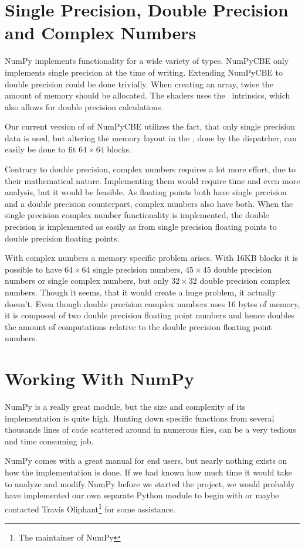 \section{Single Precision, Double Precision and Complex Numbers}

NumPy implements functionality for a wide variety of types. NumPyCBE
only implements single precision at the time of writing. Extending
NumPyCBE to double precision could be done trivially. When creating an
array, twice the amount of memory should be allocated. The shaders
uses the \CBE\ intrinsics, which also allows for double precision
calculations.

Our current version of of NumPyCBE utilizes the fact, that only single
precision data is used, but altering the memory layout in the \LS{},
done by the dispatcher, can easily be done to fit $64 \times 64$
blocks.

Contrary to double precision, complex numbers requires a lot more
effort, due to their mathematical nature. Implementing them would
require time and even more analysis, but it would be feasible. As
floating points both have single precision and a double precision
counterpart, complex numbers also have both. When the single
precision complex number functionality is implemented, the double
precision is implemented as easily as from single precision floating
points to double precision floating points.

With complex numbers a memory specific problem arises. With 16KB
blocks it is possible to have $64 \times 64$ single precision numbers,
$45 \times 45$ double precision numbers or single complex numbers, but
only $32 \times 32$ double precision complex numbers. Though it seems,
that it would create a huge problem, it actually doesn't. Even though
double precision complex numbers uses 16 bytes of memory, it is
composed of two double precision floating point numbers and hence
doubles the amount of computations relative to the double precision
floating point numbers.

\section{Working With NumPy}

NumPy is a really great module, but the size and complexity of its implementation
is quite high. Hunting down specific functions from several thousands lines of code scattered
around in numerous files, can be a very tedious and time consuming
job. 

NumPy comes with a great manual for end users, but nearly nothing
exists on how the implementation is done. If we had known how much
time it would take to analyze and modify NumPy before we started the
project, we would probably have implemented our own separate Python module
to begin with or maybe contacted Travis Oliphant\footnote{The maintainer of
  NumPy} for some assistance.

